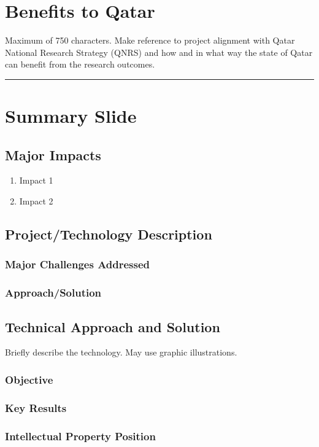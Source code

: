 \section{Benefits to Qatar}
Maximum of 750 characters. Make reference to project alignment with Qatar National Research Strategy (QNRS) and how and in what way the state of Qatar can benefit from the research outcomes.
\\\hrule

\clearpage

\section{Summary Slide}

\subsection{Major Impacts}
\begin{enumerate}
  \item Impact 1
  \item Impact 2
\end{enumerate}

\subsection{Project/Technology Description}
\subsubsection{Major Challenges Addressed}
\subsubsection{Approach/Solution}

\subsection{Technical Approach and Solution}
Briefly describe the technology. May use graphic illustrations.

\subsubsection{Objective}
\subsubsection{Key Results}
\subsubsection{Intellectual Property Position}

